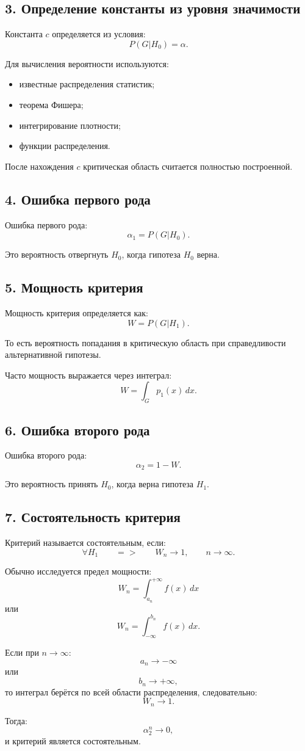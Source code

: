 \documentclass{article}
\begin{document}
\subsection*{3. Определение константы из уровня значимости}

Константа \(c\) определяется из условия:
\[
P(G|H_0)=\alpha.
\]

Для вычисления вероятности используются:
\begin{itemize}
    \item известные распределения статистик;
    \item теорема Фишера;
    \item интегрирование плотности;
    \item функции распределения.
\end{itemize}

После нахождения \(c\) критическая область считается полностью построенной.

\subsection*{4. Ошибка первого рода}

Ошибка первого рода:
\[
\alpha_1
=
P(G|H_0).
\]

Это вероятность отвергнуть \(H_0\), когда гипотеза \(H_0\) верна.

\subsection*{5. Мощность критерия}

Мощность критерия определяется как:
\[
W
=
P(G|H_1).
\]

То есть вероятность попадания в критическую область при справедливости альтернативной гипотезы.

Часто мощность выражается через интеграл:
\[
W
=
\int_G p_1(x)\,dx.
\]

\subsection*{6. Ошибка второго рода}

Ошибка второго рода:
\[
\alpha_2
=
1-W.
\]

Это вероятность принять \(H_0\), когда верна гипотеза \(H_1\).

\subsection*{7. Состоятельность критерия}

Критерий называется состоятельным, если:
\[
\forall H_1 \qquad => \qquad
W_n\to1,
\qquad
n\to\infty.
\]

Обычно исследуется предел мощности:
\[
W_n
=
\int_{a_n}^{+\infty} f(x)\,dx
\]
или
\[
W_n
=
\int_{-\infty}^{b_n} f(x)\,dx.
\]

Если при \(n\to\infty\):
\[
a_n\to-\infty
\]
или
\[
b_n\to+\infty,
\]
то интеграл берётся по всей области распределения, следовательно:
\[
W_n\to1.
\]

Тогда:
\[
\alpha_{2}^n\to0,
\]
и критерий является состоятельным.
\end{document}
